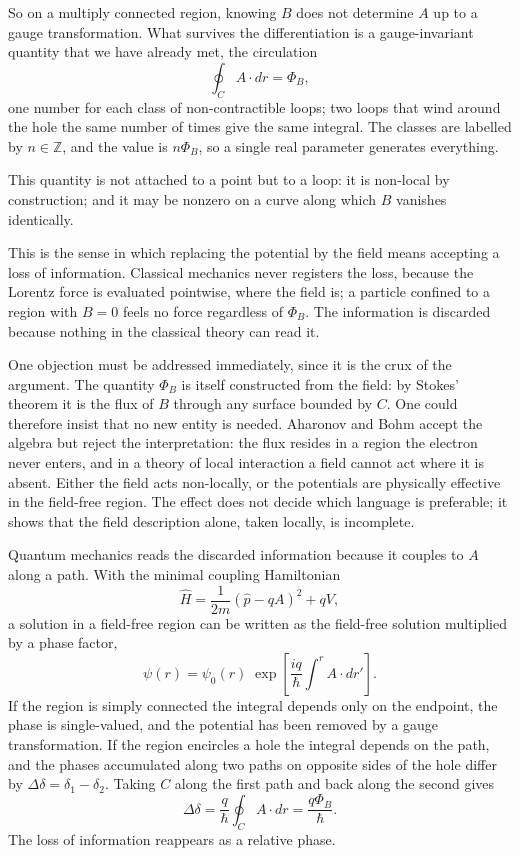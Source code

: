 So on a multiply connected region, knowing \(B\) does not determine \(A\)
up to a gauge transformation. What survives the differentiation is
a gauge-invariant quantity that we have already met, the circulation
\[
	\oint_C A \cdot dr = \Phi_B,
\]
one number for each class of non-contractible loops; two loops that wind
around the hole the same number of times give the same integral. The
classes are labelled by \(n \in \mathbb Z\), and the value is \(n \Phi_B\),
so a single real parameter generates everything.

This quantity is not attached to a point but to a loop: it is non-local
by construction; and it may be nonzero on a curve along which \(B\)
vanishes identically.

This is the sense in which replacing the potential by the field means
accepting a loss of information. Classical mechanics never registers
the loss, because the Lorentz force is evaluated pointwise, where the
field is; a particle confined to a region with \(B = 0\) feels no force
regardless of \(\Phi_B\). The information is discarded because nothing in
the classical theory can read it.


One objection must be addressed immediately, since it is the crux of
the argument.
The quantity \(\Phi_B\) is itself constructed from the field: by Stokes'
theorem it is the flux of \(B\) through any surface bounded by \(C\).
One could therefore insist that no new entity is needed. Aharonov and Bohm
accept the algebra but reject the interpretation: the flux resides in a
region the electron never enters, and in a theory of local interaction
a field cannot act where it is absent. Either the field acts non-locally,
or the potentials are physically effective in the field-free region.
The effect does not decide which language is preferable; it shows that the
field description alone, taken locally, is incomplete.


Quantum mechanics reads the discarded information because it couples to \(A\)
along a path. With the minimal coupling Hamiltonian
\[
	\hat H = \frac{1}{2m} (\hat p - qA)^2 + qV,
\]
a solution in a field-free region can be written as the field-free solution
multiplied by a phase factor,
\[
	\psi(r) = \psi_0(r) \; \exp \left[ \frac{iq}{\hbar} \int^r
		A \cdot dr'
		\right].
\]
If the region is simply connected the integral depends only on the endpoint,
the phase is single-valued, and the potential has been removed by a gauge
transformation. If the region encircles a hole the integral depends on
the path, and the phases accumulated along two paths on opposite sides
of the hole differ by
\(\Delta\delta = \delta_1 - \delta_2\). Taking \(C\) along the first path
and back along the second gives
\[
	\Delta \delta = \frac{q}{\hbar} \oint_C A \cdot dr = \frac{q \Phi_B}
	{\hbar}.
\]
The loss of information reappears as a relative phase.


